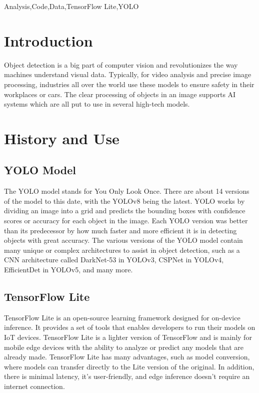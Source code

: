 \documentclass[conference]{IEEEtran}
\begin{document}
\begin{IEEEkeywords}
Analysis,Code,Data,TensorFlow Lite,YOLO
\end{IEEEkeywords}

\section{Introduction}
Object detection is a big part of computer vision and revolutionizes the way machines understand visual data.\cite{Kanjee_2023} Typically, for video analysis and precise image processing, industries all over the world use these models to ensure safety in their workplaces or cars.\cite{Gallagher_2023} The clear processing of objects in an image supports AI systems which are all put to use in several high-tech models.   

\section{History and Use}
\subsection{YOLO Model}
The YOLO model stands for You Only Look Once. There are about 14 versions of the model to this date, with the YOLOv8 being the latest. YOLO works by dividing an image into a grid and predicts the bounding boxes with confidence scores or accuracy for each object in the image.\cite{Sahota_2023} Each YOLO version was better than its predecessor by how much faster and more efficient it is in detecting objects with great accuracy. The various versions of the YOLO model contain many unique or complex architectures to assist in object detection, such as a CNN architecture called DarkNet-53 in YOLOv3, CSPNet in YOLOv4, EfficientDet in YOLOv5, and many more.  

\subsection{TensorFlow Lite}
TensorFlow Lite is an open-source learning framework designed for on-device inference. It provides a set of tools that enables developers to run their models on IoT devices.\cite{Boesch_2021} TensorFlow Lite is a lighter version of TensorFlow and is mainly for mobile edge devices with the ability to analyze or predict any models that are already made. TensorFlow Lite has many advantages, such as model conversion, where models can transfer directly to the Lite version of the original. In addition, there is minimal latency, it's user-friendly, and edge inference doesn't require an internet connection.    
\end{document}
